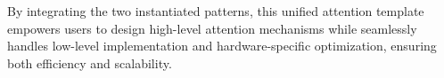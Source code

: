 By integrating the two instantiated patterns, this unified attention template empowers users to design high-level attention mechanisms while \oursys{} seamlessly handles low-level implementation and hardware-specific optimization, ensuring both efficiency and scalability.






